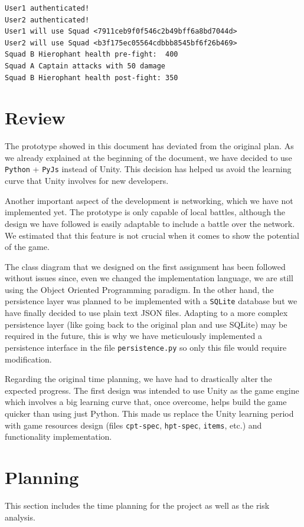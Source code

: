 \documentclass{article}
\begin{document}
\begin{lstlisting}[caption={Simulate battle use case output.},label={lst:sim-fight},captionpos=b,frame=single]
User1 authenticated!
User2 authenticated!
User1 will use Squad <7911ceb9f0f546c2b49bff6a8bd7044d>
User2 will use Squad <b3f175ec05564cdbbb8545bf6f26b469>
Squad B Hierophant health pre-fight:  400
Squad A Captain attacks with 50 damage
Squad B Hierophant health post-fight: 350
\end{lstlisting}

\section{Review}
The prototype showed in this document has deviated from the original plan. As we already explained at the beginning of the document, we have decided to use \texttt{Python} + \texttt{PyJs} instead of Unity. This decision has helped us avoid the learning curve that Unity involves for new developers. 

Another important aspect of the development is networking, which we have not implemented yet. The prototype is only capable of local battles, although the design we have followed is easily adaptable to include a battle over the network. We estimated that this feature is not crucial when it comes to show the potential of the game.

The class diagram that we designed on the first assignment has been followed without issues since, even we changed the implementation language, we are still using the Object Oriented Programming paradigm. In the other hand, the persistence layer was planned to be implemented with a \texttt{SQLite} database but we have finally decided to use plain text JSON files. Adapting to a more complex persistence layer (like going back to the original plan and use SQLite) may be required in the future, this is why we have meticulously implemented a persistence interface in the file \texttt{persistence.py} so only this file would require modification.

Regarding the original time planning, we have had to drastically alter the expected progress. The first design was intended to use Unity as the game engine which involves a big learning curve that, once overcome, helps build the game quicker than using just Python. This made us replace the Unity learning period with game resources design (files \texttt{cpt-spec}, \texttt{hpt-spec}, \texttt{items}, etc.) and functionality implementation.

\section{Planning}
This section includes the time planning for the project as well as the risk analysis.
\end{document}
